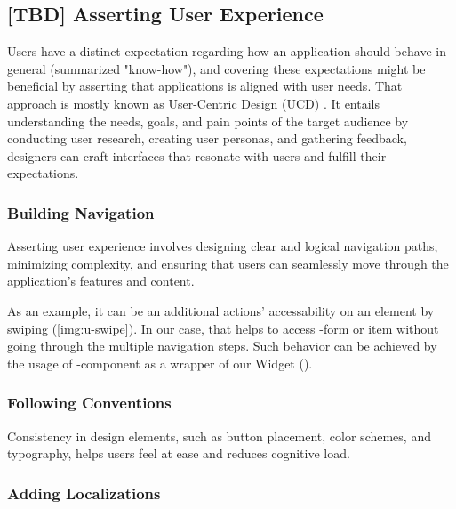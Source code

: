 
\subsection{[TBD] Asserting User Experience}

Users have a distinct expectation regarding how an application should behave in general (summarized "know-how"), and 
covering these expectations might be beneficial by asserting that applications is aligned with user needs. That approach
is mostly known as User-Centric Design (UCD) \cite{Stil16}. It entails understanding the needs, goals, and pain points 
of the target audience by conducting user research, creating user personas, and gathering feedback, designers can 
craft interfaces that resonate with users and fulfill their expectations.


\subsubsection{Building Navigation} 

Asserting user experience involves designing clear and logical navigation paths,
minimizing complexity, and ensuring that users can seamlessly move through the application's features and content.

As an example, it can be an additional actions' accessability on an element by swiping (\cref{img:u-swipe}). In our case, 
that helps to access -form or  item without going through the multiple navigation steps. Such behavior 
can be achieved by the usage of -component as a wrapper of our Widget ().



\subsubsection{Following Conventions} 

Consistency in design elements, such as button placement, color schemes, and typography, helps users feel at ease and 
reduces cognitive load.


\subsubsection{Adding Localizations} 

